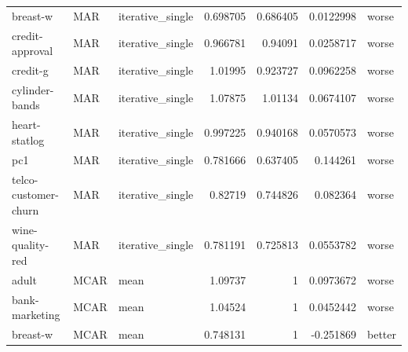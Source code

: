 \begin{table}[ht]
\begin{tabular}{lllrrrl}
 breast-w             & MAR         & iterative\_single &                                 0.698705 &                             0.686405 &                     0.0122998  & worse                \\
 credit-approval      & MAR         & iterative\_single &                                 0.966781 &                             0.94091  &                     0.0258717  & worse                \\
 credit-g             & MAR         & iterative\_single &                                 1.01995  &                             0.923727 &                     0.0962258  & worse                \\
 cylinder-bands       & MAR         & iterative\_single &                                 1.07875  &                             1.01134  &                     0.0674107  & worse                \\
 heart-statlog        & MAR         & iterative\_single &                                 0.997225 &                             0.940168 &                     0.0570573  & worse                \\
 pc1                  & MAR         & iterative\_single &                                 0.781666 &                             0.637405 &                     0.144261   & worse                \\
 telco-customer-churn & MAR         & iterative\_single &                                 0.82719  &                             0.744826 &                     0.082364   & worse                \\
 wine-quality-red     & MAR         & iterative\_single &                                 0.781191 &                             0.725813 &                     0.0553782  & worse                \\
 adult                & MCAR        & mean             &                                 1.09737  &                             1        &                     0.0973672  & worse                \\
 bank-marketing       & MCAR        & mean             &                                 1.04524  &                             1        &                     0.0452442  & worse                \\
 breast-w             & MCAR        & mean             &                                 0.748131 &                             1        &                    -0.251869   & better               \\

\end{tabular}
\end{table}
